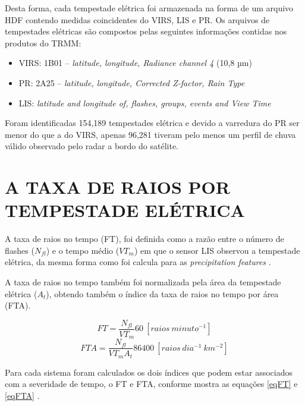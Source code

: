 Desta forma, cada tempestade elétrica foi armazenada na forma de um arquivo HDF contendo medidas coincidentes do VIRS, LIS e PR. Os arquivos de tempestades elétricas são compostos pelas seguintes informações contidas nos produtos do TRMM:

\begin{itemize}
\item VIRS: 1B01 -- \textit{latitude, longitude, Radiance channel 4} (10,8 µm)
\item PR: 2A25 -- \textit{latitude, longitude, Corrected Z-factor, Rain Type} 
\item LIS: \textit{latitude and longitude of, flashes, groups, events and View Time}  
\end{itemize} 

Foram identificadas 154,189 tempestades elétrica e devido a varredura do PR ser menor do que a do VIRS, apenas 96,281 tiveram pelo menos um perfil de chuva válido observado pelo radar a bordo do satélite.


\section{A TAXA DE RAIOS POR TEMPESTADE ELÉTRICA}
\label{metodoFtaFt}
A taxa de raios no tempo (FT), foi definida como a razão entre o número de flashes ($N_{fl}$) e o tempo médio ($VT_m$) em que o sensor LIS observou a tempestade elétrica, da mesma forma como foi calcula para as \textit{precipitation features} \cite{cecil2005, Nesbitt2000}. 



A taxa de raios no tempo também foi normalizada pela área da tempestade elétrica ($A_t$), obtendo também o índice da taxa de raios no tempo por área (FTA). 

\begin{equation}
FT = \frac{N_{fl} }{VT_m} 60 ~[raios~minuto^{-1}]  
\label{eqFT}  
\end{equation}
\begin{equation}
FTA = \frac{N_{fl} }{VT_m A_t } 86400 ~[raios~dia^{-1}~km^{-2}]
\label{eqFTA}
\end{equation}

Para cada sistema foram calculados os dois índices que podem estar associados com a severidade de tempo, o FT e FTA, conforme mostra as equações \ref{eqFT} e \ref{eqFTA} 
 .

